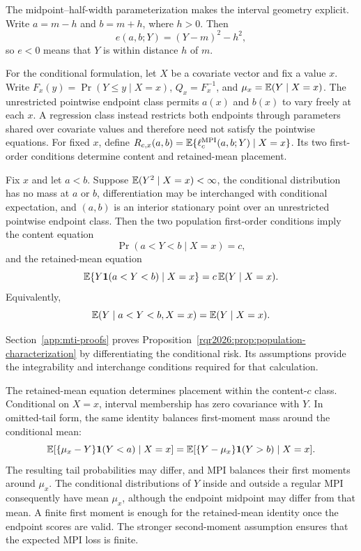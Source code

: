 The midpoint--half-width parameterization makes the interval geometry
explicit. Write \(a=m-h\) and \(b=m+h\), where \(h>0\). Then
\[
e(a,b;Y)=(Y-m)^2-h^2,
\]
so \(e<0\) means that \(Y\) is within distance \(h\) of \(m\).

For the conditional formulation, let \(X\) be a covariate vector and fix a
value \(x\). Write \(F_x(y)=\Pr(Y\le y\mid X=x)\),
\(Q_x=F_x^{-1}\), and \(\mu_x=\mathbb{E}(Y\mid X=x)\). The unrestricted pointwise
endpoint class permits \(a(x)\) and \(b(x)\) to vary freely at each \(x\).
A regression class instead restricts both endpoints through parameters shared
over covariate values and therefore need not satisfy the pointwise equations.
For fixed \(x\), define
\(R_{c,x}(a,b)=\mathbb{E}\{\ell_c^{\mathrm{MPI}}(a,b;Y)\mid X=x\}\).
Its two first-order conditions determine content and retained-mean placement.

\begin{proposition}
\label{rqr2026:prop:population-characterization}
Fix \(x\) and let \(a<b\). Suppose
\(\mathbb{E}(Y^2\mid X=x)<\infty\), the conditional distribution has no mass at \(a\)
or \(b\), differentiation may be interchanged with conditional expectation,
and \((a,b)\) is an interior stationary point over an unrestricted pointwise
endpoint class. Then the two population first-order conditions imply the
content equation
\begin{equation}
\Pr(a<Y<b\mid X=x)=c,
\label{rqr2026:eq:mpi-content-score}
\end{equation}
and the retained-mean equation
\begin{equation}
\mathbb{E}\{Y\mathbf{1}(a<Y<b)\mid X=x\}
=c\,\mathbb{E}(Y\mid X=x).
\label{rqr2026:eq:mpi-retained-mean-score}
\end{equation}
Equivalently,
\[
\mathbb{E}(Y\mid a<Y<b,X=x)=\mathbb{E}(Y\mid X=x).
\]
\end{proposition}

Section~\ref{app:mti-proofs} proves
Proposition~\ref{rqr2026:prop:population-characterization} by differentiating
the conditional risk. Its assumptions provide the integrability and
interchange conditions required for that calculation.

The retained-mean equation determines placement within the content-\(c\)
class. Conditional on \(X=x\), interval membership has zero covariance with
\(Y\). In omitted-tail form, the same
identity balances first-moment mass around the conditional mean:
\[
\mathbb{E}[\{\mu_x-Y\}\mathbf{1}(Y<a)\mid X=x]
=
\mathbb{E}[\{Y-\mu_x\}\mathbf{1}(Y>b)\mid X=x].
\]
The resulting tail probabilities may differ, and MPI balances their first moments around
\(\mu_x\). The conditional distributions of \(Y\) inside and outside a regular
MPI consequently have mean \(\mu_x\), although the endpoint midpoint may differ
from that mean. A finite first moment is enough for the retained-mean identity
once the endpoint scores are valid. The stronger second-moment assumption
ensures that the expected MPI loss is finite.

